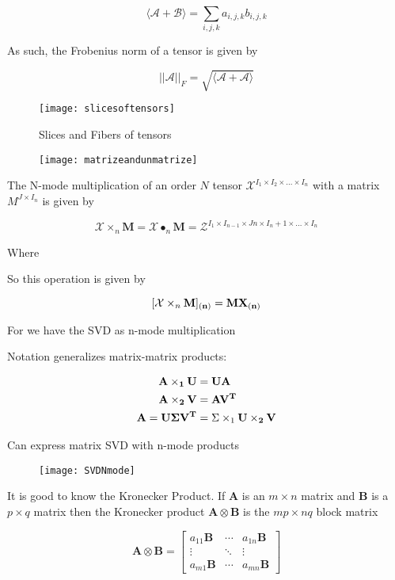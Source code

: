 \[
    \langle\mathcal{A} + \mathcal{B}\rangle = \sum_{i,j,k} a_{i,j,k} b_{i,j,k}
\]


As such, the Frobenius norm of a tensor is given by

\[
    ||\mathcal{A}||_F = \sqrt{\langle\mathcal{A} + \mathcal{A}\rangle}
\]

\begin{figure}[H]
  \centering
  \texttt{[image: slicesoftensors]}
  \caption{Slices and Fibers of tensors}\label{fig:slicesoftensors}
\end{figure}

\begin{figure}[H]
  \centering
  \texttt{[image: matrizeandunmatrize]}
\end{figure}

The N-mode multiplication of an order $N$ tensor $\mathcal{X}^{I_1 \times I_2 \times ... \times I_n}$ with a matrix $M^{J \times I_n}$ is given by

\[
    \mathcal{X} \times_n \bm{M} = \mathcal{X} \bullet_n \bm{M} = \mathcal{Z}^{I_1 \times I_{n-1} \times J{n} \times I_n + 1 \times ... \times I_n}
\]

Where

So this operation is given by

\[
    [\mathcal{X} \times_n \bf{M}]_{(n)} = \bf{M}\bf{X}_{(n)}
\]

For we have the SVD as n-mode multiplication

Notation generalizes matrix-matrix products:

\begin{align*}
  \bf{A} \times_1 \bf{U} & = \bf{U}\bf{A} \\
  \bf{A} \times_2 \bf{V} & = \bf{A}\bf{V}^T \\
  \bf{A} = \bf{U}\Sigma\bf{V}^T & = \Sigma \times_1 \bf{U} \times_2 \bf{V}
\end{align*}

Can express matrix SVD with n-mode products

\begin{figure}[H]
  \centering
  \texttt{[image: SVDNmode]}
\end{figure}

It is good to know the Kronecker Product. If $\bm{A}$ is an $m \times n$ matrix and $\bm{B}$ is a $p \times q$ matrix then the Kronecker product $\bm{A} \otimes \bm{B}$ is the $mp \times nq$ block matrix

\[
    \bm{A} \otimes \bm{B} =
    \begin{bmatrix}
      a_{11}\bm{B}  & \cdots & a_{1n}\bm{B} \\
      \vdots & \ddots & \vdots \\
      a_{m1}\bm{B} & \cdots & a_{mn}\bm{B}
    \end{bmatrix}
\]

